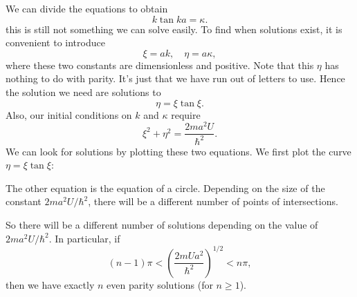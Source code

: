 \documentclass[a4paper]{article}
\begin{document}
We can divide the equations to obtain
\[
  k \tan ka = \kappa.
\]
this is still not something we can solve easily. To find when solutions exist, it is convenient to introduce
\[
  \xi = ak, \quad \eta = a\kappa,
\]
where these two constants are dimensionless and positive. Note that this $\eta$ has nothing to do with parity. It's just that we have run out of letters to use. Hence the solution we need are solutions to
\[
  \eta = \xi \tan \xi.
\]
Also, our initial conditions on $k$ and $\kappa$ require
\[
  \xi^2 + \eta^2 = \frac{2ma^2 U}{\hbar^2}.
\]
We can look for solutions by plotting these two equations. We first plot the curve $\eta = \xi \tan \xi$:
\begin{center}
\end{center}
The other equation is the equation of a circle. Depending on the size of the constant $2ma^2 U/\hbar^2$, there will be a different number of points of intersections.
\begin{center}
\end{center}
So there will be a different number of solutions depending on the value of $2ma^2 U/\hbar^2$. In particular, if
\[
  (n - 1)\pi < \left(\frac{2mUa^2}{\hbar^2}\right)^{1/2} < n\pi,
\]
then we have exactly $n$ even parity solutions (for $n \geq 1$).
\end{document}
